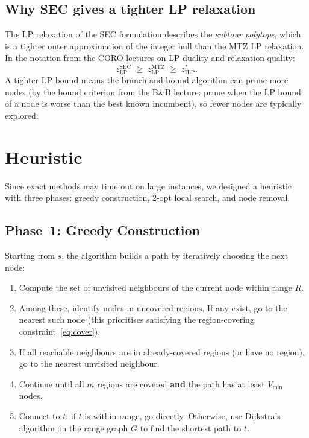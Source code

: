 \documentclass[12pt, a4paper]{article}
\begin{document}
\subsection{Why SEC gives a tighter LP relaxation}

The LP relaxation of the SEC formulation describes the \emph{subtour polytope}, which
is a tighter outer approximation of the integer hull than the MTZ LP relaxation. In
the notation from the CORO lectures on LP duality and relaxation quality:
\[
  z_{\mathrm{LP}}^{\mathrm{SEC}} \;\geq\; z_{\mathrm{LP}}^{\mathrm{MTZ}}
  \;\geq\; z_{\mathrm{ILP}}^*.
\]
A tighter LP bound means the branch-and-bound algorithm can prune more nodes (by the
bound criterion from the B\&B lecture: prune when the LP bound of a node is worse than
the best known incumbent), so fewer nodes are typically explored.


\section{Heuristic}

Since exact methods may time out on large instances, we designed a heuristic with
three phases: greedy construction, 2-opt local search, and node removal.

\subsection{Phase~1: Greedy Construction}

Starting from $s$, the algorithm builds a path by iteratively choosing the next node:
\begin{enumerate}[nosep]
  \item Compute the set of unvisited neighbours of the current node within range $R$.
  \item Among these, identify nodes in uncovered regions. If any exist, go to the
        nearest such node (this prioritises satisfying the region-covering
        constraint~\eqref{eq:cover}).
  \item If all reachable neighbours are in already-covered regions (or have no
        region), go to the nearest unvisited neighbour.
  \item Continue until all $m$ regions are covered \textbf{and} the path has at least
        $V_{\min}$ nodes.
  \item Connect to $t$: if $t$ is within range, go directly. Otherwise, use
        Dijkstra's algorithm on the range graph $G$ to find the shortest path to $t$.
\end{enumerate}
\end{document}
